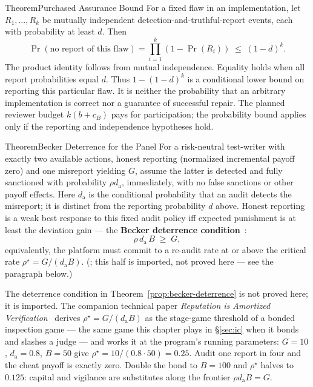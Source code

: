 \documentclass[11pt,a4paper]{article}
\theoremstyle{definition}
\theoremstyle{definition}
\theoremstyle{remark}
\begin{document}
\begin{pdclaim}{Theorem}{Purchased Assurance Bound}
\setlength{\parskip}{4pt plus 1pt}
\label{thm:assurance}
For a fixed flaw in an implementation, let $R_1,\ldots,R_k$ be mutually
independent detection-and-truthful-report events, each with probability at least
$d$. Then
\begin{equation}
\Pr(\text{no report of this flaw})
 =\prod_{i=1}^k(1-\Pr(R_i))\;\le\;(1-d)^k.
\end{equation}
The product identity follows from mutual independence. Equality holds when
all report probabilities equal $d$. Thus $1-(1-d)^k$ is a conditional lower
bound on reporting this particular flaw. It is neither the probability that
an arbitrary implementation is correct nor a guarantee of successful repair.
The planned reviewer budget $k(b+c_B)$ pays for participation; the probability
bound applies only if the reporting and independence hypotheses hold.
\end{pdclaim}

\begin{pdclaim}{Theorem}{Becker Deterrence for the Panel}
\setlength{\parskip}{4pt plus 1pt}
\label{prop:becker-deterrence}
For a risk-neutral test-writer with exactly two available actions, honest
reporting (normalized incremental payoff zero) and one misreport yielding
$G$, assume the latter is detected and fully sanctioned with probability
$\rho d_{\mathrm a}$, immediately, with no false sanctions or other payoff effects. Here
$d_{\mathrm a}$ is the conditional probability that an audit detects the
misreport; it is distinct from the reporting probability $d$ above.
Honest reporting is a weak best response to this fixed audit policy iff
expected punishment is at least the deviation gain --- the \textbf{Becker deterrence condition}~:
\begin{equation}\label{eq:becker}
\rho\, d_{\mathrm a}\, B \;\ge\; G ,
\end{equation}
equivalently, the platform must commit to a re-audit rate at or above the
critical rate $\rho^\star = G/(d_{\mathrm a}B)$. (\Designed{}; this half is imported, not
proved here --- see the paragraph below.)
\end{pdclaim}

\noindent The deterrence condition in Theorem~\ref{prop:becker-deterrence} is
not proved here; it is imported.
The companion technical paper \emph{Reputation is Amortized
Verification}~ derives $\rho^\star = G/(d_{\mathrm a}B)$ as the stage-game
threshold of a bonded inspection game --- the same game this chapter plays in
\S\ref{sec:ic} when it bonds and slashes a judge --- and works it at the program's
running parameters: $G=10$, $d_{\mathrm a}=0.8$, $B=50$ give $\rho^\star = 10/(0.8 \cdot 50)
= 0.25$. Audit one report in four and the cheat payoff is exactly zero. Double the
bond to $B=100$ and $\rho^\star$ halves to $0.125$: capital and vigilance are
substitutes along the frontier $\rho d_{\mathrm a} B = G$.
\end{document}
